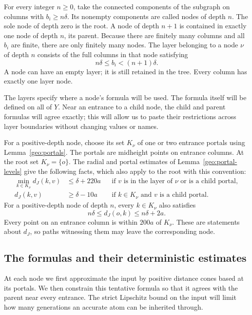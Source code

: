 For every integer $n\ge0$, take the connected components of the
subgraph on columns with $b_i\ge n\delta$.  Its nonempty components
are called nodes of depth $n$.  The sole node of depth zero is the
root.  A node of depth $n+1$ is contained in exactly one node of depth
$n$, its parent.  Because there are finitely many columns and all
$b_i$ are finite, there are only finitely many nodes.  The layer
belonging to a node $\nu$ of depth $n$ consists of the full columns in
that node satisfying
\[
 n\delta\le b_i<(n+1)\delta.
\]
A node can have an empty layer; it is still retained in the tree.
Every column has exactly one layer node.

The layers specify where a node's formula will be used.  The formula itself
will be defined on all of $Y$.  Near an entrance to a child node, the child
and parent formulas will agree exactly; this will allow us to paste their
restrictions across layer boundaries without changing values or names.

For a positive-depth node, choose its set $K_\nu$ of one or two
entrance portals using Lemma~\ref{geo:portals}.  The portals are
midheight points on entrance columns.  At the root set $K_\nu=\{o\}$.
The radial and portal estimates of Lemma~\ref{geo:portal-levels} give
the following facts, which also apply to the root with this convention:
\begin{align}
 \min_{k\in K_\nu}d_J(k,v)&\le\delta+220a
 &&\text{if $v$ is in the layer of $\nu$ or is a child portal},
 \label{int:near-portal}\\
 d_J(k,v)&\ge\delta-10a
 &&\text{if $k\in K_\nu$ and $v$ is a child portal}.
 \label{int:separated-portals}
\end{align}
For a positive-depth node of depth $n$, every $k\in K_\nu$ also
satisfies
\begin{equation}\label{int:portal-radial}
 n\delta\le d_J(o,k)\le n\delta+2a.
\end{equation}
Every point on an entrance column is within $200a$ of $K_\nu$.
These are statements about $d_J$, so paths witnessing them may leave
the corresponding node.

\subsection{The formulas and their deterministic estimates}

At each node we first approximate the input by positive distance cones
based at its portals. We then constrain this tentative formula so that
it agrees with the parent near every entrance. The strict Lipschitz
bound on the input will limit how many generations an accurate atom
can be inherited through.

